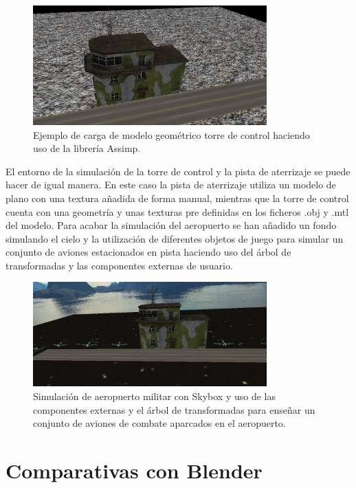 \documentclass[a4paper]{book}
\begin{document}
\begin{figure}[H]
    \centering
    \includegraphics[width=9cm, keepaspectratio]{img/Tower.png}
    \caption{Ejemplo de carga de modelo geométrico torre de control haciendo uso de la librería Assimp.}
    \label{Tower}
\end{figure}

El entorno de la simulación de la torre de control y la pista de aterrizaje se puede hacer de igual manera. En este caso la pista de aterrizaje
utiliza un modelo de plano con una textura añadida de forma manual, mientras que la torre de control cuenta con una geometría y unas texturas
pre definidas en los ficheros .obj y .mtl del modelo. Para acabar la simulación del aeropuerto se han añadido un fondo simulando el cielo y
la utilización de diferentes objetos de juego para simular un conjunto de aviones estacionados en pista haciendo uso del árbol de transformadas
y las componentes externas de usuario.

\begin{figure}[H]
    \centering
    \includegraphics[width=9cm, keepaspectratio]{img/AirportMultiplePlanes.png}
    \caption{Simulación de aeropuerto militar con Skybox y uso de las componentes externas y el árbol de transformadas para enseñar un
    conjunto de aviones de combate aparcados en el aeropuerto.}
    \label{AirportMultiplePlanes}
\end{figure}

\section{Comparativas con Blender}
\label{sec:BlenderComp}
\end{document}
